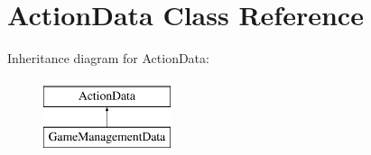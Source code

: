 \hypertarget{class_action_data}{\section{Action\+Data Class Reference}
\label{class_action_data}
}
Inheritance diagram for Action\+Data\+:\begin{figure}[H]
\begin{center}
\leavevmode
\includegraphics[height=2.000000cm]{class_action_data}
\end{center}
\end{figure}
